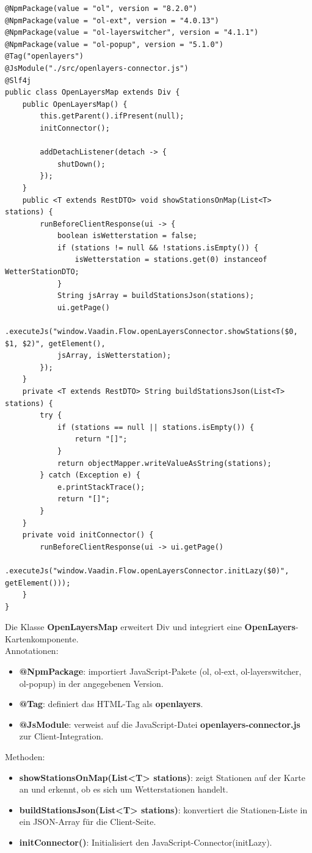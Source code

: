 \documentclass[a4paper,12pt]{scrreprt}
\begin{document}
\begin{lstlisting}
@NpmPackage(value = "ol", version = "8.2.0")
@NpmPackage(value = "ol-ext", version = "4.0.13")
@NpmPackage(value = "ol-layerswitcher", version = "4.1.1")
@NpmPackage(value = "ol-popup", version = "5.1.0")
@Tag("openlayers")
@JsModule("./src/openlayers-connector.js")
@Slf4j
public class OpenLayersMap extends Div {
	public OpenLayersMap() {
		this.getParent().ifPresent(null);
		initConnector();
		
		addDetachListener(detach -> {
			shutDown();
		});
	}
	public <T extends RestDTO> void showStationsOnMap(List<T> stations) {
		runBeforeClientResponse(ui -> {
			boolean isWetterstation = false;
			if (stations != null && !stations.isEmpty()) {
				isWetterstation = stations.get(0) instanceof WetterStationDTO;
			}
			String jsArray = buildStationsJson(stations);
			ui.getPage()
			.executeJs("window.Vaadin.Flow.openLayersConnector.showStations($0, $1, $2)", getElement(),
			jsArray, isWetterstation);
		});
	}
	private <T extends RestDTO> String buildStationsJson(List<T> stations) {
		try {
			if (stations == null || stations.isEmpty()) {
				return "[]";
			}
			return objectMapper.writeValueAsString(stations);
		} catch (Exception e) {
			e.printStackTrace();
			return "[]";
		}
	}
	private void initConnector() {
		runBeforeClientResponse(ui -> ui.getPage()
		.executeJs("window.Vaadin.Flow.openLayersConnector.initLazy($0)", getElement()));
	}
}
\end{lstlisting}

Die Klasse \textbf{OpenLayersMap} erweitert Div und integriert eine  \textbf{OpenLayers}-Kartenkomponente.\\
Annotationen:
\begin{itemize}
\item \textbf{@NpmPackage}: importiert JavaScript-Pakete (ol, ol-ext, ol-layerswitcher, ol-popup) in der angegebenen Version.
\item \textbf{@Tag}: definiert das HTML-Tag als \textbf{openlayers}.
\item \textbf{@JsModule}: verweist auf die JavaScript-Datei \textbf{openlayers-connector.js} zur Client-Integration.
\end{itemize}
Methoden:
\begin{itemize}
	\item \textbf{showStationsOnMap(List<T> stations)}: zeigt Stationen auf der Karte an und erkennt, ob es sich um Wetterstationen handelt.
	\item \textbf{buildStationsJson(List<T> stations)}: konvertiert die Stationen-Liste in ein JSON-Array für die Client-Seite.
	\item \textbf{initConnector()}: Initialisiert den JavaScript-Connector(initLazy).
\end{itemize}
\end{document}
